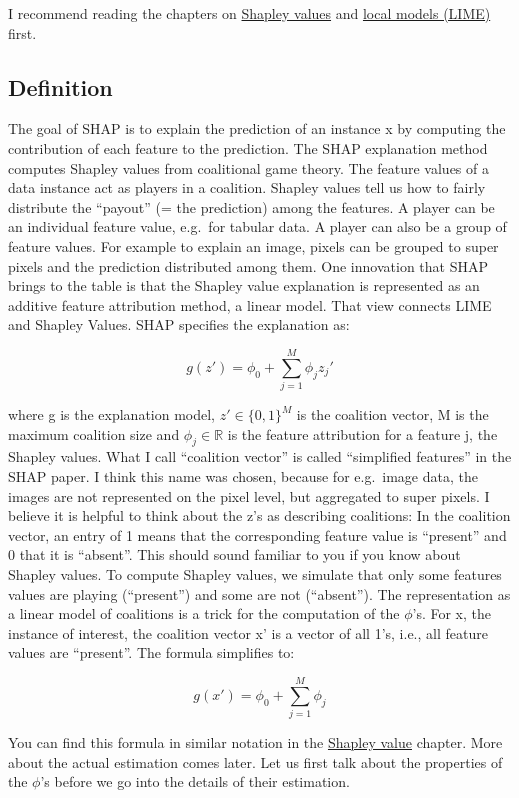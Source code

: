 \documentclass[12pt,]{krantz}
\begin{document}
I recommend reading the chapters on \protect\hyperlink{shapley}{Shapley
values} and \protect\hyperlink{lime}{local models (LIME)} first.

\subsection{Definition}\label{definition}

The goal of SHAP is to explain the prediction of an instance x by
computing the contribution of each feature to the prediction. The SHAP
explanation method computes Shapley values from coalitional game theory.
The feature values of a data instance act as players in a coalition.
Shapley values tell us how to fairly distribute the ``payout'' (= the
prediction) among the features. A player can be an individual feature
value, e.g.~for tabular data. A player can also be a group of feature
values. For example to explain an image, pixels can be grouped to super
pixels and the prediction distributed among them. One innovation that
SHAP brings to the table is that the Shapley value explanation is
represented as an additive feature attribution method, a linear model.
That view connects LIME and Shapley Values. SHAP specifies the
explanation as:

\[g(z')=\phi_0+\sum_{j=1}^M\phi_jz_j'\]

where g is the explanation model, \(z'\in\{0,1\}^M\) is the coalition
vector, M is the maximum coalition size and \(\phi_j\in\mathbb{R}\) is
the feature attribution for a feature j, the Shapley values. What I call
``coalition vector'' is called ``simplified features'' in the SHAP
paper. I think this name was chosen, because for e.g.~image data, the
images are not represented on the pixel level, but aggregated to super
pixels. I believe it is helpful to think about the z's as describing
coalitions: In the coalition vector, an entry of 1 means that the
corresponding feature value is ``present'' and 0 that it is ``absent''.
This should sound familiar to you if you know about Shapley values. To
compute Shapley values, we simulate that only some features values are
playing (``present'') and some are not (``absent''). The representation
as a linear model of coalitions is a trick for the computation of the
\(\phi\)'s. For x, the instance of interest, the coalition vector x' is
a vector of all 1's, i.e., all feature values are ``present''. The
formula simplifies to:

\[g(x')=\phi_0+\sum_{j=1}^M\phi_j\]

You can find this formula in similar notation in the
\protect\hyperlink{shapley}{Shapley value} chapter. More about the
actual estimation comes later. Let us first talk about the properties of
the \(\phi\)'s before we go into the details of their estimation.
\end{document}
